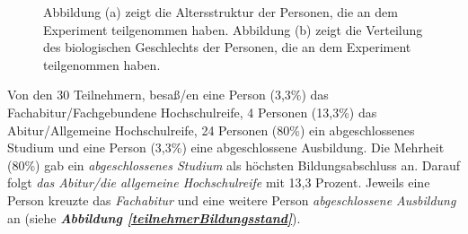 \documentclass[a4paper,11pt]{article}%
\renewcommand{\\}{\vspace*{0.5\baselineskip} \newline}
\begin{document}
{	\begin{figure}[h]
  \centering
  \qquad
  \caption[Altersstruktur und biologisches Geschlecht der Teilnehmer]{Abbildung (a) zeigt die Altersstruktur der Personen, die an dem Experiment teilgenommen haben. Abbildung (b) zeigt die Verteilung des biologischen Geschlechts der Personen, die an dem Experiment teilgenommen haben.}
  \label{teilnehmer Alter}
\end{figure}

Von den 30 Teilnehmern, besaß/en eine Person (3,3\%) das Fachabitur/Fachgebundene Hochschulreife, 4 Personen (13,3\%) das Abitur/Allgemeine Hochschulreife, 24 Personen (80\%) ein abgeschlossenes Studium und eine Person (3,3\%) eine abgeschlossene Ausbildung. 
Die Mehrheit (80\%)  gab ein \textit{abgeschlossenes Studium} als höchsten Bildungsabschluss an. Darauf folgt \textit{das Abitur/die allgemeine Hochschulreife} mit 13,3 Prozent. Jeweils eine Person kreuzte das \textit{Fachabitur} und eine weitere Person \textit{abgeschlossene Ausbildung} an (siehe \textbf{\textit{Abbildung \ref{teilnehmerBildungsstand}}}).

}
\end{document}
